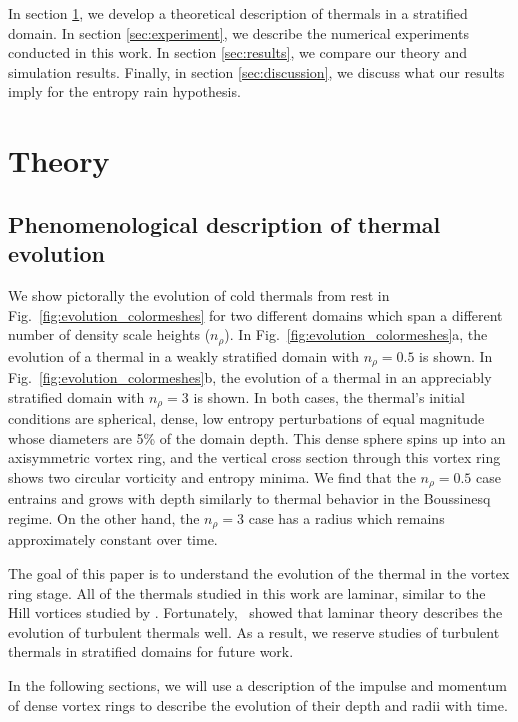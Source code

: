 \documentclass[twocolumn, amsmath, amsfonts, amssymb, trackchanges]{aastex62}
\newcommand{\LJ}{\citetalias{lecoanet&jeevanjee2018}}
\begin{document}
In section \ref{sec:theory}, we develop a theoretical description of thermals in a stratified domain. 
In section \ref{sec:experiment}, we describe the numerical experiments conducted in this work. 
In section \ref{sec:results}, we compare our theory and simulation results. 
Finally, in section \ref{sec:discussion}, we discuss what our results imply for the entropy rain hypothesis.

\section{Theory}
\label{sec:theory}

\subsection{Phenomenological description of thermal evolution}
We show pictorally the evolution of cold thermals from rest in Fig.~\ref{fig:evolution_colormeshes} for two different domains which span a different number of density scale heights ($n_\rho$). 
In Fig.~\ref{fig:evolution_colormeshes}a, the evolution of a thermal in a weakly stratified domain with $n_\rho = 0.5$ is shown. 
In Fig.~\ref{fig:evolution_colormeshes}b, the evolution of a thermal in an appreciably stratified domain with $n_\rho = 3$ is shown. 
In both cases, the thermal's initial conditions are spherical, dense, low entropy perturbations of equal magnitude whose diameters are 5\% of the domain depth.
This dense sphere spins up into an axisymmetric vortex ring, and the vertical cross section through this vortex ring shows two circular vorticity and entropy minima.
We find that the $n_\rho = 0.5$ case entrains and grows with depth similarly to thermal behavior in the Boussinesq regime.
On the other hand, the $n_\rho = 3$ case has a radius which remains approximately constant over time.

The goal of this paper is to understand the evolution of the thermal in the vortex ring stage.
All of the thermals studied in this work are laminar, similar to the Hill vortices studied by \citet{brandenburg2016}.
Fortunately, \LJ\, showed that laminar theory describes the evolution of turbulent thermals well.
As a result, we reserve studies of turbulent thermals in stratified domains for future work.

In the following sections, we will use a description of the impulse and momentum of dense vortex rings to describe the evolution of their depth and radii with time.
\end{document}
